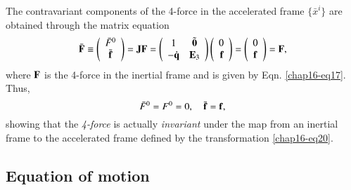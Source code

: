 The contravariant components of the 4-force in the accelerated frame $\{\bar{x}^i\}$  are obtained through the matrix equation
\begin{equation}
\bar{\mathbf{F}}\equiv \left(\begin{array}{c} \bar{F}^0 \\
\bar{\mathbf{f}} \end{array}\right)=
\mathbf{J}\mathbf{F}=\left(\begin{array}{cc} 1 & \tilde{\mathbf{0}}  \\
-{\mathbf{\dot{q}}}& \mathbf{E}_3 \end{array}\right) 
\left(\begin{array}{rc}0 \\{\mathbf{f}} \end{array}\right)= 
\left(\begin{array}{cc} 0 \\ {\mathbf{f}}
\end{array}\right)={\mathbf{F}},\label{chap16-eq33}
\end{equation}
where $\mathbf{F}$ is the 4-force in the inertial frame and is given by Eqn. \eqref{chap16-eq17}. Thus,
\begin{equation}
\bar{F}^0={F}^0=0, \quad \bar{\mathbf{f}}=\mathbf{f},\label{chap16-eq34}
\end{equation}
showing that the \textsl{4-force} is actually \textsl{invariant} under the map from an inertial frame to the  accelerated frame defined by the transformation 
\eqref{chap16-eq20}.

\subsection{Equation of motion}\label{chap16-sec6.7}

